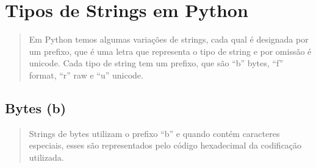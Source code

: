 \documentclass[letterpaper,10pt,brazil]{sphinxmanual}
\begin{document}
\begin{sphinxVerbatim}[commandchars=\\\{\}]
\end{sphinxVerbatim}

\begin{sphinxVerbatim}[commandchars=\\\{\}]
\end{sphinxVerbatim}


\section{Tipos de Strings em Python}
\label{\detokenize{content/str:tipos-de-strings-em-python}}\begin{quote}

Em Python temos algumas variações de strings, cada qual é designada por um prefixo, que é uma letra que representa o tipo de string e por omissão é unicode.
Cada tipo de string tem um prefixo, que são “b” bytes, “f” format, “r” raw e “u” unicode.
\end{quote}

\begin{sphinxVerbatim}[commandchars=\\\{\}]
  
\end{sphinxVerbatim}

\begin{sphinxVerbatim}[commandchars=\\\{\}]
\end{sphinxVerbatim}


\subsection{Bytes (b)}
\label{\detokenize{content/str:bytes-b}}\begin{quote}

Strings de bytes utilizam o prefixo “b” e quando contém caracteres especiais, esses são representados pelo código hexadecimal da codificação utilizada.
\end{quote}
\end{document}
